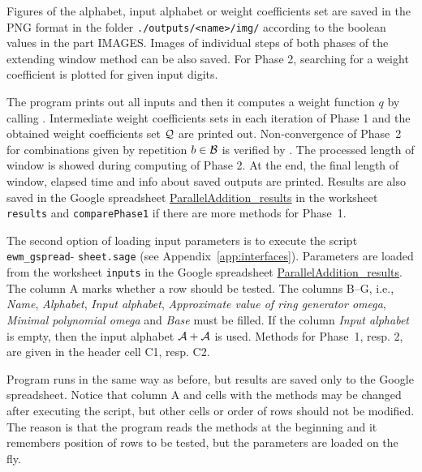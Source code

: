 Figures of the alphabet, input alphabet or weight coefficients set are saved in the PNG format in the folder \verb+./outputs/<name>/img/+ according to the boolean values in the part IMAGES. Images of individual steps of both phases of the extending window method can be also saved. For Phase 2, searching for a weight coefficient  is plotted for given input digits.  

The program prints out all inputs and then it computes a weight function $q$ by calling . Intermediate weight coefficients sets in each iteration of Phase 1 and the obtained weight coefficients set $\mathcal{Q}$ are printed out. Non-convergence of Phase~2 for combinations given by repetition $b\in\mathcal{B}$ is verified by . The processed length of window is showed during computing of Phase 2. At the end, the final length of window, elapsed time and info about saved outputs are printed. Results are also saved in the Google spreadsheet \href{https://docs.google.com/spreadsheets/d/1TnhrHdefHfHa0WSeVs4q6XVj3epjPlPlnoekE0E1xeM/edit?usp=sharing}{ParallelAddition\_results} in the worksheet \verb+results+ and \verb+comparePhase1+ if there are more methods for Phase~1.

The second option of loading input parameters is to execute the script \verb+ewm_gspread+- \verb+sheet.sage+ (see Appendix~\ref{app:interfaces}). Parameters are loaded from the worksheet \verb+inputs+ in the Google spreadsheet \href{https://docs.google.com/spreadsheets/d/1TnhrHdefHfHa0WSeVs4q6XVj3epjPlPlnoekE0E1xeM/edit?usp=sharing}{ParallelAddition\_results}. The column A marks whether a row should be tested. The columns B--G, i.e., \emph{Name}, \emph{Alphabet}, \emph{Input alphabet}, \emph{Approximate value of ring generator omega}, \emph{Minimal polynomial omega} and \emph{Base} must be filled. If the column \emph{Input alphabet} is empty, then the input alphabet $\mathcal{A}+\mathcal{A}$ is used. Methods for Phase~1, resp. 2, are given in the header cell C1, resp. C2.

Program runs in the same way as before, but results are saved only to the Google spreadsheet. Notice that column A and cells with the methods may be changed  after executing the script, but other cells or order of rows should not be modified. The reason is that the program reads the methods at the beginning and it remembers position of rows to be tested, but the parameters are loaded on the fly.

